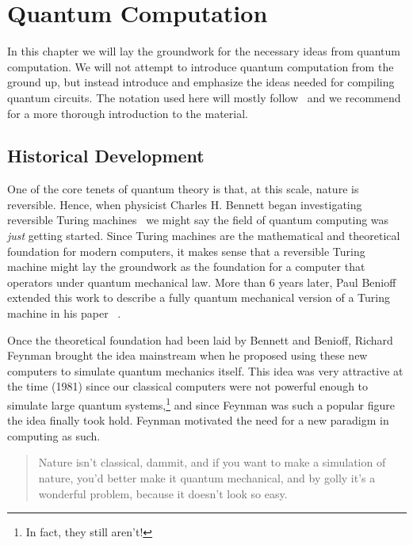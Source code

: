 \chapter{Quantum Computation}\label{chap:quantum}

In this chapter we will lay the groundwork for the necessary ideas from quantum computation.
We will not attempt to introduce quantum computation from the ground up, but instead introduce and emphasize the ideas needed for compiling quantum circuits.
The notation used here will mostly follow~\cite{watroustqi} and we recommend~\cite{nielsenchuang} for a more thorough introduction to the material.

\section{Historical Development}\label{sec:history}

One of the core tenets of quantum theory is that, at this scale, nature is reversible.
Hence, when physicist Charles H. Bennett began investigating reversible Turing machines~\cite{reversibleturing} we might say the field of quantum computing was \emph{just} getting started.
Since Turing machines are the mathematical and theoretical foundation for modern computers, it makes sense that a reversible Turing machine might lay the groundwork as the foundation for a computer that operators under quantum mechanical law.
More than 6 years later, Paul Benioff extended this work to describe a fully quantum mechanical version of a Turing machine in his paper ~\cite{quantumturing}.

Once the theoretical foundation had been laid by Bennett and Benioff, Richard Feynman brought the idea mainstream when he proposed using these new computers to simulate quantum mechanics itself.
This idea was very attractive at the time (1981) since our classical computers were not powerful enough to simulate large quantum systems,\footnote{In fact, they still aren't!} and since Feynman was such a popular figure the idea finally took hold.
Feynman motivated the need for a new paradigm in computing as such.
\begin{quote}
    Nature isn't classical, dammit, and if you want to make a simulation of nature, you'd better make it quantum mechanical, and by golly it's a wonderful problem, because it doesn't look so easy.
\end{quote}

